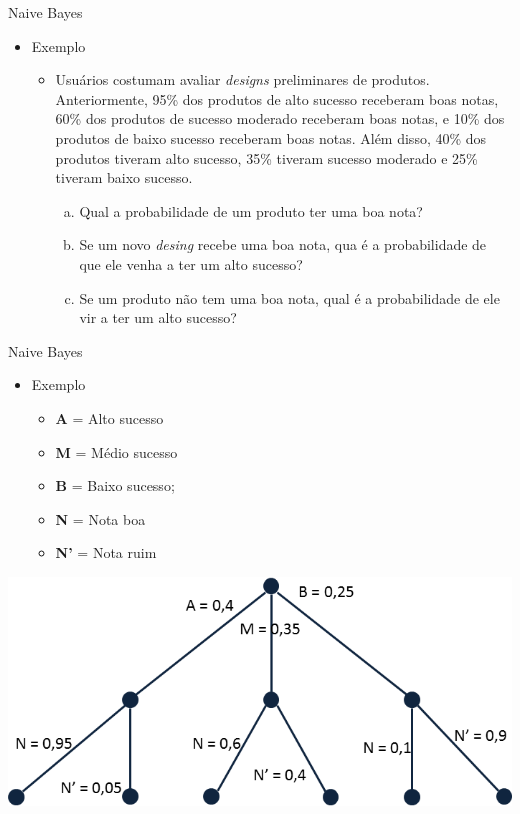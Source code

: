 \documentclass{libs/ufc_format}
\begin{document}
\begin{frame}{Naive Bayes}
    \begin{itemize}
        \item Exemplo
            \begin{itemize}
                \justifying
                \item Usuários costumam avaliar \textit{designs} preliminares de produtos. Anteriormente, 95\% dos produtos de alto sucesso receberam boas notas, 60\% dos produtos de sucesso moderado receberam boas notas, e 10\% dos produtos de baixo sucesso receberam boas notas. Além disso, 40\% dos produtos tiveram alto sucesso, 35\% tiveram sucesso moderado e 25\% tiveram baixo sucesso.
                    \begin{enumerate}[(a)]
                        \justifying
                        \item Qual a probabilidade de um produto ter uma boa nota?
                        \item Se um novo \textit{desing} recebe uma boa nota, qua é a probabilidade de que ele venha a ter um alto sucesso?
                        \item Se um produto não tem uma boa nota, qual é a probabilidade de ele vir a ter um alto sucesso?
                    \end{enumerate}
            \end{itemize}
    \end{itemize}
\end{frame}

\begin{frame}{Naive Bayes}
    \begin{itemize}
        \item Exemplo
            \begin{itemize}
                \item \textbf{A} = Alto sucesso
                \item \textbf{M} = Médio sucesso
                \item \textbf{B} = Baixo sucesso;
                \item \textbf{N} = Nota boa
                \item \textbf{N'} = Nota ruim
            \end{itemize}
    \end{itemize}
    \vspace{0.15cm}
    \centering
    \includegraphics[scale=0.5]{media/questao2}
\end{frame}
\end{document}
